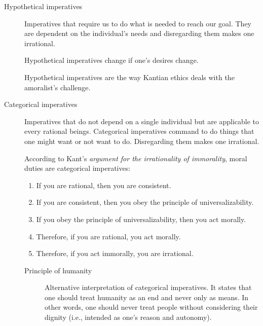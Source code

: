 \begin{description}
    \item[Hypothetical imperatives] 
        Imperatives that require us to do what is needed to reach our goal. They are dependent on the individual's needs and disregarding them makes one irrational.

        \begin{remark}
            Hypothetical imperatives change if one's desires change.
        \end{remark}

        \begin{remark}
            Hypothetical imperatives are the way Kantian ethics deals with the amoralist's challenge.
        \end{remark}

    \item[Categorical imperatives] 
        Imperatives that do not depend on a single individual but are applicable to every rational beings. Categorical imperatives command to do things that one might want or not want to do. Disregarding them makes one irrational.

        \begin{remark}
            According to Kant's \textit{argument for the irrationality of immorality}, moral duties are categorical imperatives:
            \begin{enumerate}
                \item If you are rational, then you are consistent.
                \item If you are consistent, then you obey the principle of universalizability.
                \item If you obey the principle of universalizability, then you act morally.
                \item Therefore, if you are rational, you act morally.
                \item Therefore, if you act immorally, you are irrational.
            \end{enumerate}
        \end{remark}

        \begin{description}
            \item[Principle of humanity] 
                Alternative interpretation of categorical imperatives. It states that one should treat humanity as an end and never only as means. In other words, one should never treat people without considering their dignity (i.e., intended as one's reason and autonomy).
        \end{description}
\end{description}

